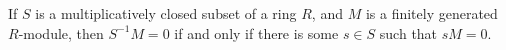 If $S$ is a multiplicatively closed subset of a ring $R$, and $M$ is a finitely
generated $R$-module, then $S^{-1}M = 0$ if and only if there is some  $s \in S$
such that $sM = 0$.
